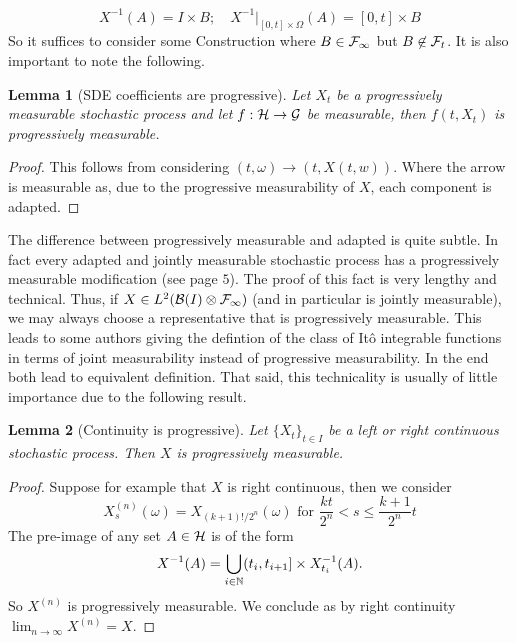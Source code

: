 \documentclass[12pt]{article}
\newtheorem{lemma}{Lemma}
\begin{document}
\begin{equation*}
	X^{-1}(A)=I\times B;\quad {X^{-1}}|_{[0,t]\times\Omega}(A)= [0,t]\times B
\end{equation*}
So it suffices to consider some Construction where $B\in\mathcal{F}_\infty$ but $B\not\in\mathcal{F}_t$.
It is also important to note the following.
\begin{lemma}[SDE coefficients are progressive]
	Let $X_t$ be a  progressively measurable stochastic process and let $f:\mathcal{H}\to\mathcal{G}$ be measurable, then $f(t,X_t)$ is progressively measurable.
\end{lemma}
\begin{proof}
	This follows from considering $(t,\omega)\to (t,X(t,w))$. Where the arrow is measurable as, due to the progressive measurability of $X$, each component is adapted.
\end{proof}
The difference between progressively measurable and adapted is quite subtle. In fact every adapted and jointly measurable stochastic process has a progressively measurable modification (see \cite{Karatzas1987BrownianMA} page $5$). The proof of this fact is very lengthy and technical. Thus, if $X\in L^2(\mathcal{B}(I)\otimes\mathcal{F}_\infty)$ (and in particular is jointly measurable), we may always choose a representative that is progressively measurable. This leads to some authors giving the defintion of the class of Itô integrable functions in terms of joint measurability instead of progressive measurability. In the end both lead to equivalent definition. That said, this technicality is usually of little importance due to the following result.
\begin{lemma}[Continuity is progressive]
	Let $\{X_t\}_{t\in I}$ be a left or right continuous stochastic process. Then $X$ is progressively measurable.
\end{lemma}
\begin{proof}
	Suppose for example that $X$ is right continuous, then we consider
	\begin{equation*}
		X_{s}^{(n)}(\omega)=X_{(k+1) ! / 2^{n}}(\omega) \text { for } \frac{k t}{2^{n}}<s \leq \frac{k+1}{2^{n}} t
	\end{equation*}
	The pre-image of any set $A\in\mathcal{H}$ is of the form
	\begin{equation*}
		X^{-1}(A)=\bigcup_{i\in \mathbb{N}}(t_i,t_{i+1}]\times X_{t_i}^{-1}(A).
	\end{equation*}
	So $X^{(n)}$ is progressively measurable.	We conclude as by right continuity $\lim_{n \to \infty}X^{(n)}=X$.
\end{proof}
\end{document}
